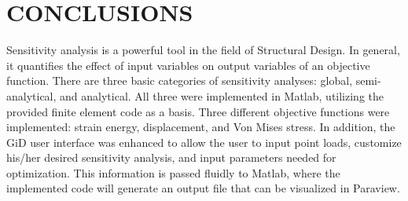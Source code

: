 \section{CONCLUSIONS}
Sensitivity analysis is a powerful tool in the field of Structural Design. In general, it quantifies the effect of input variables on output variables of an objective function. There are three basic categories of sensitivity analyses: global, semi-analytical, and analytical. All three were implemented in Matlab, utilizing the provided finite element code as a basis. Three different objective functions were implemented: strain energy, displacement, and Von Mises stress. In addition, the GiD user interface was enhanced to allow the user to input point loads, customize his/her desired sensitivity analysis, and input parameters needed for optimization. This information is passed fluidly to Matlab, where the implemented code will generate an output file that can be visualized in Paraview.
